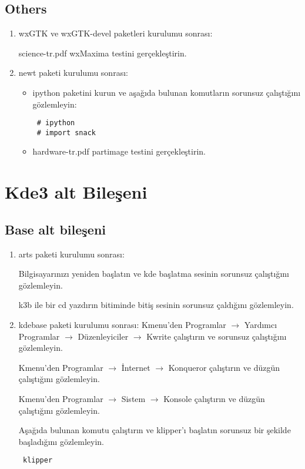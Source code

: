 \documentclass[a4paper,10pt]{article}
\begin{document}
\subsection*{Others}
\begin{enumerate}
\item wxGTK ve wxGTK-devel paketleri kurulumu sonrası:

science-tr.pdf wxMaxima testini gerçekleştirin.

 \item newt paketi kurulumu sonrası:
\begin{itemize}
 \item ipython paketini kurun ve aşağıda bulunan komutların sorunsuz çalıştığını gözlemleyin:
\begin{verbatim}
 # ipython
 # import snack
\end{verbatim}
  \item hardware-tr.pdf partimage testini gerçekleştirin.

\end{itemize}
 


\end{enumerate}

\section{Kde3 alt Bileşeni}
\subsection*{Base alt bileşeni}
\begin{enumerate}
\item arts paketi kurulumu sonrası:

Bilgisayarınızı yeniden başlatın ve kde başlatma sesinin sorunsuz çalıştığını gözlemleyin.

k3b ile bir cd yazdırın bitiminde bitiş sesinin sorunsuz çaldığını gözlemleyin.

 \item kdebase paketi kurulumu sonrası:
Kmenu'den Programlar $\rightarrow$ Yardımcı Programlar $\rightarrow$ Düzenleyiciler $\rightarrow$ Kwrite çalıştırın ve sorunsuz çalıştığını gözlemleyin.

Kmenu'den Programlar $\rightarrow$ İnternet $\rightarrow$ Konqueror çalıştırın ve düzgün çalıştığını gözlemleyin.

Kmenu'den Programlar $\rightarrow$ Sistem $\rightarrow$ Konsole çalıştırın ve düzgün çalıştığını gözlemleyin.

Aşağıda bulunan komutu çalıştırın ve klipper'ı başlatın sorunsuz bir şekilde başladığını gözlemleyin.

\begin{verbatim}
 klipper
\end{verbatim}

\end{enumerate}
\end{document}
